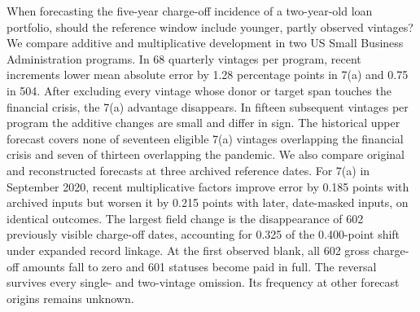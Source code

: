 When forecasting the five-year charge-off incidence of a two-year-old loan portfolio, should the reference window include younger, partly observed vintages? We compare additive and multiplicative development in two US Small Business Administration programs. In 68 quarterly vintages per program, recent increments lower mean absolute error by 1.28 percentage points in 7(a) and 0.75 in 504. After excluding every vintage whose donor or target span touches the financial crisis, the 7(a) advantage disappears. In fifteen subsequent vintages per program the additive changes are small and differ in sign. The historical upper forecast covers none of seventeen eligible 7(a) vintages overlapping the financial crisis and seven of thirteen overlapping the pandemic. We also compare original and reconstructed forecasts at three archived reference dates. For 7(a) in September 2020, recent multiplicative factors improve error by 0.185 points with archived inputs but worsen it by 0.215 points with later, date-masked inputs, on identical outcomes. The largest field change is the disappearance of 602 previously visible charge-off dates, accounting for 0.325 of the 0.400-point shift under expanded record linkage. At the first observed blank, all 602 gross charge-off amounts fall to zero and 601 statuses become paid in full. The reversal survives every single- and two-vintage omission. Its frequency at other forecast origins remains unknown.
